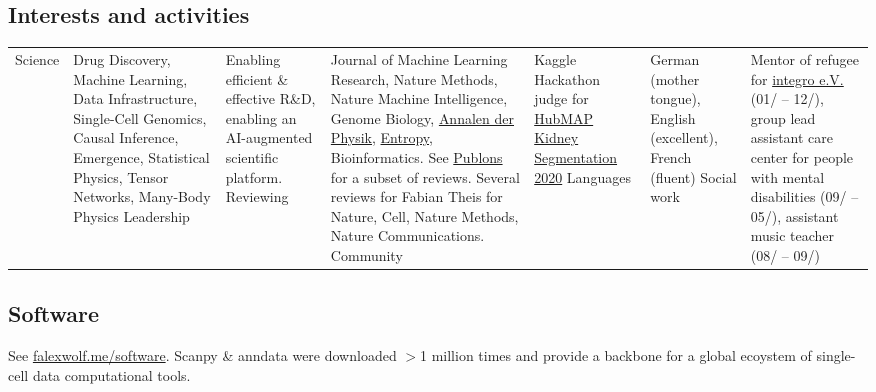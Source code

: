 \subsection*{Interests and activities}\vspace{-1em}
\begin{longtable}[t]{R{\widthC} p{\widthB}}
Science
& Drug Discovery, Machine Learning, Data Infrastructure, Single-Cell Genomics, Causal Inference, Emergence,  Statistical Physics, Tensor Networks, Many-Body Physics
\newline
Leadership 
& Enabling efficient \& effective R\&D, enabling an AI-augmented scientific platform.
\newline
Reviewing
& Journal of Machine Learning Research, Nature Methods, Nature Machine Intelligence, Genome Biology,  \href{https://en.wikipedia.org/wiki/Annalen_der_Physik}{Annalen der  Physik}, \href{https://en.wikipedia.org/wiki/Entropy_(journal)}{Entropy}, Bioinformatics. See \href{https://publons.com/author/1299815/f-alexander-wolf}{Publons} for a subset of reviews. Several reviews for Fabian Theis for Nature, Cell, Nature Methods, Nature Communications.
\newline
Community
& Kaggle Hackathon judge for \href{https://www.kaggle.com/c/hubmap-kidney-segmentation}{HubMAP Kidney Segmentation 2020}
\newline
Languages
& German (mother tongue), English (excellent), French (fluent)
\newline
Social work
& Mentor of refugee for \href{http://integro-ev.de/}{integro e.V.} (01/ -- 12/), group lead assistant care center for people with mental disabilities (09/ -- 05/), assistant music teacher (08/ -- 09/)
\end{longtable}

\subsection*{Software}
See \href{http://falexwolf.me/software/}{falexwolf.me/software}. Scanpy \& anndata were downloaded $>$1 million times and provide a backbone for a global ecoystem of single-cell data computational tools.

